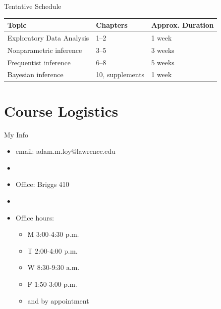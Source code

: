 \documentclass[10pt]{beamer}
\begin{document}
\begin{frame}[fragile]{Tentative Schedule}

\begin{center}
\begin{tabular}{l l l}\hline
\bf Topic & \bf Chapters & \bf Approx. Duration\\ \hline
Exploratory Data Analysis & 1--2 & 1 week \\
Nonparametric inference & 3--5 & 3 weeks \\
Frequentist inference & 6--8 & 5 weeks \\
Bayesian inference & 10, supplements & 1 week \\ \hline
\end{tabular}
\end{center}

\end{frame}


\section{Course Logistics}




\begin{frame}[fragile]{My Info}

\begin{itemize}
\item email: adam.m.loy@lawrence.edu
\item[]
\item Office: Briggs 410
\item[]
\item Office hours:
	\begin{itemize}
	\item M 3:00-4:30 p.m.
	\item T 2:00-4:00 p.m.
	\item W 8:30-9:30 a.m.
	\item F 1:50-3:00 p.m.
	\item and by appointment
	\end{itemize}

\end{itemize}


\end{frame}
\end{document}
